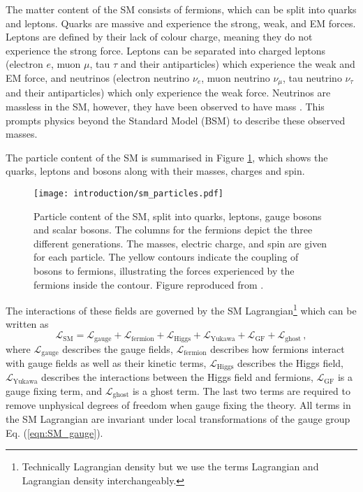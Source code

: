 \documentclass[main.tex]{subfiles}
\begin{document}
    The matter content of the SM consists of fermions, which can be split
    into quarks and leptons. Quarks are massive and experience the strong,
    weak, and EM forces. Leptons are defined by their lack of colour charge,
    meaning they do not experience the strong force. Leptons can be separated
    into charged leptons (electron $e$, muon $\mu$, tau $\tau$
    and their antiparticles) which experience the weak and EM force, and 
    neutrinos (electron neutrino $\nu_{e}$, muon neutrino $\nu_{\mu}$, tau
    neutrino $\nu_{\tau}$ and their antiparticles) which only experience the
    weak force. Neutrinos are massless in the SM, however, they have been
    observed to have mass \cite{Super-Kamiokande:1998kpq,SNO:2002tuh}. This
    prompts physics beyond the Standard Model (BSM) to describe these observed masses.

    The particle content of the SM is summarised in Figure \ref{fig:SM_particles},
    which shows the quarks, leptons and bosons along with their masses, charges
    and spin.
    \begin{figure}
        \texttt{[image: introduction/sm\_particles.pdf]}
        \caption{Particle content of the SM, split into quarks, leptons,
        gauge bosons and scalar bosons. The columns for the fermions depict
        the three different generations. The masses, electric charge, and spin
        are given for each particle. The yellow contours indicate the coupling
        of bosons to fermions, illustrating the forces experienced by the
        fermions inside the contour. Figure reproduced from \cite{SM_figure}.}
        \label{fig:SM_particles}
    \end{figure}
    The interactions of these fields are governed by the SM Lagrangian\footnote{Technically Lagrangian density but we use the terms
    Lagrangian and Lagrangian density interchangeably.}
    which can be written as
    \begin{equation}\label{eqn:L_SM}
        \mathcal{L}_{\mathrm{SM}} = \mathcal{L}_{\mathrm{gauge}} + \mathcal{L}_{\mathrm{fermion}} + \mathcal{L}_{\mathrm{Higgs}} + \mathcal{L}_{\mathrm{Yukawa}} + \mathcal{L}_{\mathrm{GF}} + \mathcal{L}_{\mathrm{ghost}} \, ,
    \end{equation}
    where $\mathcal{L}_{\mathrm{gauge}}$ describes the gauge fields,
    $\mathcal{L}_{\mathrm{fermion}}$ describes how fermions interact with
    gauge fields as well as their kinetic terms,
    $\mathcal{L}_{\mathrm{Higgs}}$ describes the Higgs field,
    $\mathcal{L}_{\mathrm{Yukawa}}$ describes the interactions between the Higgs
    field and fermions,
    $\mathcal{L}_{\mathrm{GF}}$ is a gauge fixing term,
    and $\mathcal{L}_{\mathrm{ghost}}$ is a ghost term.
    The last two terms are required to remove unphysical degrees of freedom
    when gauge fixing the theory.
    All terms in the SM Lagrangian are invariant under local transformations
    of the gauge group Eq. (\ref{eqn:SM_gauge}).
\end{document}
